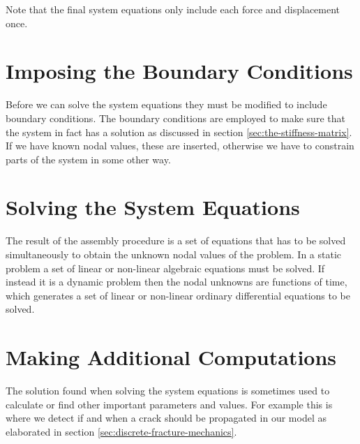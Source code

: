 Note that the final system equations only include each force and
displacement once.

\section{Imposing the Boundary Conditions}
Before we can solve the system equations they must be modified to
include boundary conditions. The boundary conditions are employed to
make sure that the system in fact has a solution as discussed in
section \vref{sec:the-stiffness-matrix}.
If we have known nodal values, these are inserted, otherwise we have
to constrain parts of the system in some other way.

\section{Solving the System Equations}
The result of the assembly procedure is a set of equations that has to be
solved simultaneously to obtain the unknown nodal values of the
problem. In a static problem a set of linear or non-linear
algebraic equations must be solved.
If instead it is a dynamic problem then the nodal unknowns
are functions of time, which generates a set of linear or non-linear
ordinary differential equations to be solved.

\section{Making Additional Computations}
The solution found when solving the system equations is
sometimes used to calculate or find other important parameters and
values.
For example this is where we detect if and when a crack should
be propagated in our model as elaborated in section
\vref{sec:discrete-fracture-mechanics}.
